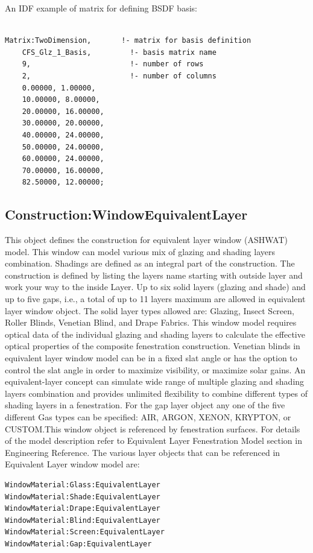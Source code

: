 An IDF example of matrix for defining BSDF basis:

\begin{lstlisting}

Matrix:TwoDimension,       !- matrix for basis definition
    CFS_Glz_1_Basis,         !- basis matrix name
    9,                       !- number of rows
    2,                       !- number of columns
    0.00000, 1.00000,
    10.00000, 8.00000,
    20.00000, 16.00000,
    30.00000, 20.00000,
    40.00000, 24.00000,
    50.00000, 24.00000,
    60.00000, 24.00000,
    70.00000, 16.00000,
    82.50000, 12.00000;
\end{lstlisting}

\subsection{Construction:WindowEquivalentLayer}\label{constructionwindowequivalentlayer}

This object defines the construction for equivalent layer window (ASHWAT) model. This window can model various mix of glazing and shading layers combination. Shadings are defined as an integral part of the construction. The construction is defined by listing the layers name starting with outside layer and work your way to the inside Layer. Up to six solid layers (glazing and shade) and up to five gaps, i.e., a total of up to 11 layers maximum are allowed in equivalent layer window object. The solid layer types allowed are: Glazing, Insect Screen, Roller Blinds, Venetian Blind, and Drape Fabrics. This window model requires optical data of the individual glazing and shading layers to calculate the effective optical properties of the composite fenestration construction. Venetian blinds in equivalent layer window model can be in a fixed slat angle or has the option to control the slat angle in order to maximize visibility, or maximize solar gains. An equivalent-layer concept can simulate wide range of multiple glazing and shading layers combination and provides unlimited flexibility to combine different types of shading layers in a fenestration. For the gap layer object any one of the five different Gas types can be specified: AIR, ARGON, XENON, KRYPTON, or CUSTOM.This window object is referenced by fenestration surfaces. For details of the model description refer to Equivalent Layer Fenestration Model section in Engineering Reference. The various layer objects that can be referenced in Equivalent Layer window model are:

\begin{lstlisting}
WindowMaterial:Glass:EquivalentLayer
WindowMaterial:Shade:EquivalentLayer
WindowMaterial:Drape:EquivalentLayer
WindowMaterial:Blind:EquivalentLayer
WindowMaterial:Screen:EquivalentLayer
WindowMaterial:Gap:EquivalentLayer
\end{lstlisting}

